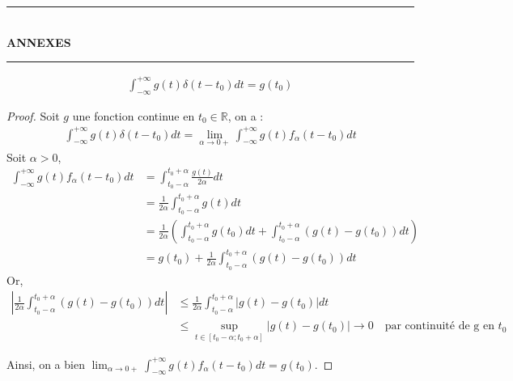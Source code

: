 \pagebreak
\begin{center}
    \rule{\textwidth}{1pt} \\[0.5cm]
    {\Huge \bfseries ANNEXES} \\[0.4cm]
    \rule{\textwidth}{1pt}
\end{center}


\label{demo1}
\begin{align*}
    \int_{-\infty}^{+\infty} g(t) \delta(t-t_0) dt = g(t_0)
\end{align*}
\begin{proof}
    \vspace{0.2cm}
    
    Soit $g$ une fonction continue en $t_0 \in \mathbb{R}$, on a :
    \begin{align*}
        \int_{-\infty}^{+\infty} g(t) \delta(t - t_0) dt = \lim_{\alpha \to 0+} \int_{-\infty}^{+\infty} g(t) f_{\alpha}(t - t_0) dt
    \end{align*}
    Soit $\alpha > 0$,
    \begin{align*}
        \int_{-\infty}^{+\infty} g(t) f_{\alpha}(t - t_0) dt &= \int_{t_0 - \alpha}^{t_0 + \alpha} \frac{g(t)}{2\alpha} dt \\
        &= \frac{1}{2 \alpha} \int_{t_0 - \alpha}^{t_0 + \alpha} g(t) dt \\
        &= \frac{1}{2 \alpha} \left( \int_{t_0 - \alpha}^{t_0 + \alpha} g(t_0) dt + \int_{t_0 - \alpha}^{t_0 + \alpha} \left( g(t) - g(t_0) \right) dt \right) \\
        &= g(t_0) + \frac{1}{2 \alpha} \int_{t_0 - \alpha}^{t_0 + \alpha} \left( g(t) - g(t_0) \right) dt
    \end{align*}
    Or, 
    \begin{align*}
        \left| \frac{1}{2 \alpha} \int_{t_0 - \alpha}^{t_0 + \alpha} \left( g(t) - g(t_0) \right) dt \right| &\leq \frac{1}{2 \alpha} \int_{t_0 - \alpha}^{t_0 + \alpha} \left| g(t) - g(t_0) \right| dt \\
        &\leq \sup_{t \in \left[ t_0 - \alpha ; t_0 + \alpha \right]} \left| g(t) - g(t_0) \right| \to 0 \quad \text{par continuité de g en $t_0$}
    \end{align*}

    Ainsi, on a bien $\lim_{\alpha \to 0+} \int_{-\infty}^{+\infty} g(t) f_{\alpha}(t - t_0) dt = g(t_0)$.

\end{proof}

\pagebreak


